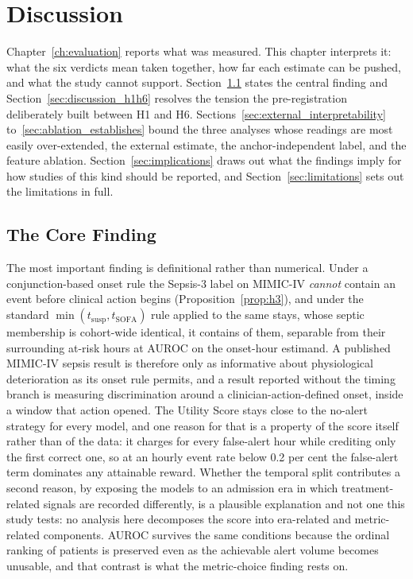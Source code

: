 \chapter{Discussion}
\label{ch:discussion}

Chapter~\ref{ch:evaluation} reports what was measured. This chapter interprets
it: what the six verdicts mean taken together, how far each estimate can be
pushed, and what the study cannot support. Section~\ref{sec:discussion_core}
states the central finding and Section~\ref{sec:discussion_h1h6} resolves the
tension the pre-registration deliberately built between H1 and H6.
Sections~\ref{sec:external_interpretability} to~\ref{sec:ablation_establishes}
bound the three analyses whose readings are most easily over-extended, the
external estimate, the anchor-independent label, and the feature ablation.
Section~\ref{sec:implications} draws out what the findings imply for how
studies of this kind should be reported, and
Section~\ref{sec:limitations} sets out the limitations in full.


\section{The Core Finding}
\label{sec:discussion_core}

The most important finding is definitional rather than numerical. Under a
conjunction-based onset rule the Sepsis-3 label on MIMIC-IV \emph{cannot}
contain an event before clinical action begins (Proposition~\ref{prop:h3}), and
under the standard $\min(t_{\text{susp}}, t_{\text{SOFA}})$ rule applied to the
same stays, whose septic membership is cohort-wide identical, it contains
\pcPreTreatOnsetsVarF{} of them, separable from
their surrounding at-risk hours at \pcPreTreatAurocPrimaryF{} AUROC on the
onset-hour estimand. A published MIMIC-IV sepsis result is
therefore only as informative about physiological deterioration as its onset
rule permits, and a result reported without the timing branch is measuring
discrimination around a clinician-action-defined onset, inside a window that
action opened.
The Utility Score stays close to the no-alert strategy for every model, and
one reason for that is a property of the score itself rather than of the data:
it charges for every false-alert hour while crediting only the first correct
one, so at an hourly event rate below 0.2 per cent the false-alert term
dominates any attainable reward. Whether the temporal split contributes a
second reason, by exposing the models to an admission era in which
treatment-related signals are recorded differently, is a plausible explanation
and not one this study tests: no analysis here decomposes the score into
era-related and metric-related components. AUROC survives the same conditions
because the ordinal ranking of patients is preserved even as the achievable
alert volume becomes unusable, and that contrast is what the metric-choice
finding rests on.

